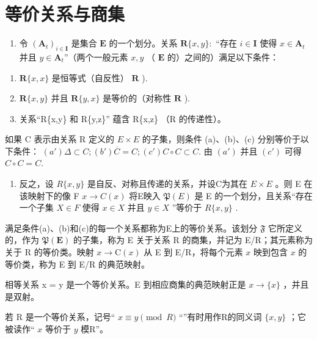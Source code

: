 \section{等价关系与商集}

\begin{enumerate}
\def\labelenumi{\arabic{enumi}.}
\tightlist
\item
  令 \((\mathbf{A}_t)_{i \in \mathbf{I}}\) 是集合 \(\mathbf{E}\) 的一个划分。关系 \(\mathbf{R}\{x, y\} :\) “存在 \(i \in \mathbf{I}\) 使得 \(x \in \mathbf{A}_t\) 并且 \(y \in \mathbf{A}_t\)''（两个一般元素 \(x, y\) （ \(\mathbf{E}\) 的）之间的）满足以下条件：
\end{enumerate}

\begin{enumerate}
\def\labelenumi{(\alph{enumi})}
\item
  \(\mathbf{R}\{x,x\}\) 是恒等式（自反性） \(\mathbf{R}\) ).
\item
  \(\mathbf{R}\{x,y\}\) 并且 \(\mathbf{R}\{y,x\}\) 是等价的（对称性 \(\mathbf{R}\) ).
\item
  关系“R\{x,y\} 和 R\{y,z\}'' 蕴含 R\{x,z\} （R 的传递性）。
\end{enumerate}

如果 C 表示由关系 R 定义的 \(E \times E\) 的子集，则条件 (a)、(b)、(c) 分别等价于以下条件： \((a') \Delta \subset C; (b') \overline{C} = C; (c') C \circ C \subset C.\) 由 \((a')\) 并且 \((c')\) 可得 \(C \circ C = C.\)

\begin{enumerate}
\def\labelenumi{\arabic{enumi}.}
\setcounter{enumi}{1}
\tightlist
\item
  反之，设 \(R\{x,y\}\) 是自反、对称且传递的关系，并设C为其在 \(E \times E\) 。则 E 在该映射下的像 F \(x \to C(x)\) 将E映入 \(\mathfrak{P}(E)\) 是 E 的一个划分，且关系“存在一个子集 \(X \in F\) 使得 \(x \in X\) 并且 \(y \in X\) ”等价于 \(R\{x, y\}\) .
\end{enumerate}

满足条件(a)、(b)和(c)的每一个关系都称为E上的等价关系。该划分 \(\mathfrak{F}\) 它所定义的，作为 \(\mathfrak{P}(\mathbf{E})\) 的子集，称为 E 关于关系 R 的商集，并记为 E/R；其元素称为关于 R 的等价类。映射 \(x \to \mathrm{C}(x)\) 从 E 到 E/R，将每个元素 \(x\) 映到包含 \(x\) 的等价类，称为 E 到 E/R 的典范映射。

相等关系 x = y 是一个等价关系。E 到相应商集的典范映射正是 \(x \to \{x\}\) ，并且是双射。

若 R 是一个等价关系，记号“ \(x \equiv y \pmod{R}\) “”有时用作R的同义词 \(\{x, y\}\) ；它被读作“ \(x\) 等价于 \(y\) 模R”。

